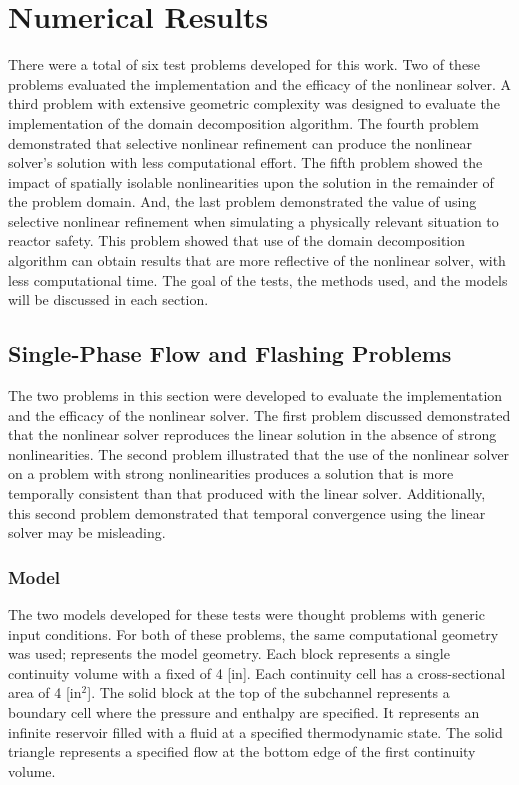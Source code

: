 \chapter{Numerical Results}
\label{chap:results}

There were a total of six test problems developed for this work.
Two of these problems evaluated the implementation and the efficacy of the nonlinear solver.
A third problem with extensive geometric complexity was designed to evaluate the implementation of the domain decomposition algorithm.
The fourth problem demonstrated that selective nonlinear refinement can produce the nonlinear solver's solution with less computational effort.
The fifth problem showed the impact of spatially isolable nonlinearities upon the solution in the remainder of the problem domain.
And, the last problem demonstrated the value of using selective nonlinear refinement when simulating a physically relevant situation to reactor safety.
This problem showed that use of the domain decomposition algorithm can obtain results that are more reflective of the nonlinear solver, with less computational time.
The goal of the tests, the methods used, and the models will be discussed in each section.

\section{Single-Phase Flow and Flashing Problems}
\label{sect:single_phase_and_flashing}

The two problems in this section were developed to evaluate the implementation and the efficacy of the nonlinear solver.
The first problem discussed demonstrated that the nonlinear solver reproduces the linear solution in the absence of strong nonlinearities.
The second problem illustrated that the use of the nonlinear solver on a problem with strong nonlinearities produces a solution that is more temporally consistent than that produced with the linear solver.
Additionally, this second problem demonstrated that temporal convergence using the linear solver may be misleading.

\subsection{Model}
\label{subsect:single_model}
The two models developed for these tests were thought problems with generic input conditions.
For both of these problems, the same computational geometry was used;   represents the model geometry.
Each block represents a single continuity volume with a fixed \dx{} of 4 [in].
Each continuity cell has a cross-sectional area of 4 [in$^2$].
The solid block at the top of the subchannel represents a boundary cell where the pressure and enthalpy are specified.
It represents an infinite reservoir filled with a fluid at a specified thermodynamic state.
The solid triangle represents a specified flow at the bottom edge of the first continuity volume. 

